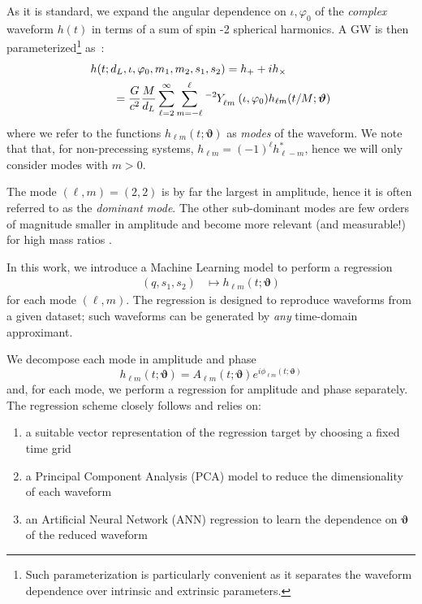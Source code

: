 \documentclass[twocolumn,showpacs,preprintnumbers,nofootinbib,prd,
superscriptaddress,10pt]{revtex4-1}
\begin{document}
As it is standard, we expand the angular dependence on $\iota, \varphi_0$ of the {\it complex} waveform $h(t)$ in terms of a sum of spin -2 spherical harmonics.
A GW is then parameterized\footnote{Such parameterization is particularly convenient as it separates the waveform dependence over intrinsic and extrinsic parameters.} as~\cite{Estelles:2021gvs}:
\begin{align} \label{eq:h_parametrization}
	&h(t; d_L,\iota,\varphi_0, m_1, m_2, s_1, s_2) = h_+ + i h_\times \nonumber \\
		&\qquad= \frac{G}{c^2} \frac{M}{d_L}\sum_{\ell = 2}^{\infty} \sum_{m = -\ell}^{\ell} \tensor[^{-2}]{Y}{_{\ell m}}(\iota, \varphi_0) h_{\ell m}(t/M; \boldsymbol{\vartheta})
\end{align}
where we refer to the functions $h_{\ell m}(t; \boldsymbol{\vartheta})$ as {\it modes} of the waveform. We note that that, for non-precessing systems, $h_{\ell m} = (-1)^\ell h^*_{\ell -m}$, hence we will only consider modes with $m>0$.

The mode $(\ell, m) = (2,2)$ is by far the largest in amplitude, hence it is often referred to as the {\it dominant mode}. The other sub-dominant modes are few orders of magnitude smaller in amplitude and become more relevant (and measurable!) for high mass ratios \cite{}.

In this work, we introduce a Machine Learning model to perform a regression
\begin{align}\label{eq:objective}
	(q, s_1, s_2) &\longmapsto h_{\ell m}(t; \boldsymbol{\vartheta})
\end{align}
for each mode $(\ell,m)$.
The regression is designed to reproduce waveforms from a given dataset; such waveforms can be generated by {\it any} time-domain approximant.

We decompose each mode in amplitude and phase
\begin{equation}
	h_{\ell m}(t; \boldsymbol{\vartheta}) = A_{\ell m}(t; \boldsymbol{\vartheta}) e^{i \phi_{\ell m}(t; \boldsymbol{\vartheta})}
\end{equation}
and, for each mode, we perform a regression for amplitude and phase separately. The regression scheme closely follows \cite{Schmidt:2020yuu} and relies on:
\begin{enumerate}[label=(\alph*)]
	\item a suitable vector representation of the regression target by choosing a fixed time grid
	\item a Principal Component Analysis (PCA) model to reduce the dimensionality of each waveform
	\item an Artificial Neural Network (ANN) regression to learn the dependence on $\boldsymbol{\vartheta}$ of the reduced waveform
\end{enumerate}
\end{document}
